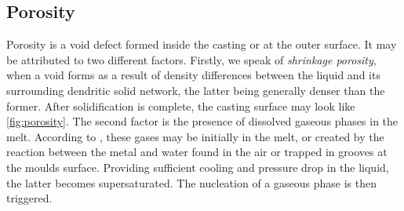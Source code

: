 \subsection*{Porosity}
%
Porosity is a void defect formed inside the casting or at the outer surface. It may be attributed to two different factors.
Firstly, we speak of \emph{shrinkage porosity}, when a void forms as a result of density 
differences between the liquid and its surrounding dendritic solid network, the latter being generally denser 
than the former. After solidification is complete, the casting surface may look like \cref{fig:porosity}.
The second factor is the presence of dissolved gaseous phases in the melt. 
According to \citet{dantzig_solidification_2009}, these gases may be initially in the melt, or created by the 
reaction between the metal and water found in the air or trapped in grooves at the moulds surface. Providing sufficient cooling
and pressure drop in the liquid, the latter becomes supersaturated. 
The nucleation of a gaseous phase is then triggered.
%
